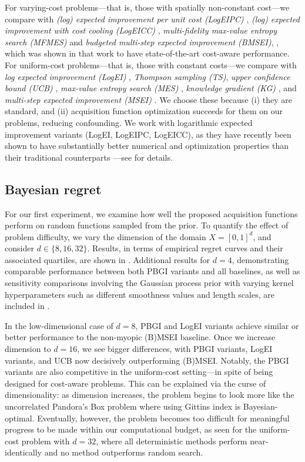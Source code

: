 \documentclass{article}
\begin{document}
For varying-cost problems---that is, those with spatially non-constant cost---we compare with \emph{(log) expected improvement per unit cost (LogEIPC)} \cite{snelson2003warped,snoek2012practical}, \emph{(log) expected improvement with cost cooling (LogEICC)} \cite{lee2020cost}, \emph{multi-fidelity max-value entropy search (MFMES)} \cite{takeno2020multi} and \emph{budgeted multi-step expected improvement (BMSEI)}, \cite{astudillo2021multi}, which was shown in that work to have state-of-the-art cost-aware performance.
For uniform-cost problems---that is, those with constant costs---we compare with \emph{log expected improvement (LogEI)} \cite{ament2023unexpected}, \emph{Thompson sampling (TS)}, \emph{upper confidence bound (UCB)} \cite{srinivas2009gaussian}, \emph{max-value entropy search (MES)} \cite{wang2017max}, \emph{knowledge gradient (KG)} \cite{frazier2009knowledge}, and \emph{multi-step expected improvement (MSEI)} \cite{jiang2020efficient}.
We choose these because (i) they are standard, and (ii) acquisition function optimization succeeds for them on our problems, reducing confounding.
We work with logarithmic expected improvement variants (LogEI, LogEIPC, LogEICC), as they have recently been shown to have substantially better numerical and optimization properties than their traditional counterparts \cite{ament2023unexpected}---see  for details.


\subsection{Bayesian regret}

For our first experiment, we examine how well the proposed acquisition functions perform on random functions sampled from the prior.
To quantify the effect of problem difficulty, we vary the dimension of the domain $X = [0,1]^d$, and consider $d \in \{8,16,32\}$.
Results, in terms of empirical regret curves and their associated quartiles, are shown in .
Additional results for $d=4$, demonstrating comparable performance between both PBGI variants and all baselines, as well as sensitivity comparisons involving the Gaussian process prior with varying kernel hyperparameters such as different smoothness values and length scales, are included in . 

In the low-dimensional case of $d=8$, PBGI and LogEI variants achieve similar or better performance to the non-myopic (B)MSEI baseline.
Once we increase dimension to $d=16$, we see bigger differences, with PBGI variants, LogEI variants, and UCB now decisively outperforming (B)MSEI.
Notably, the PBGI variants are also competitive in the uniform-cost setting---in spite of being designed for cost-aware problems.
This can be explained via the curse of dimensionality: as dimension increases, the problem begins to look more like the uncorrelated Pandora's Box problem where using Gittins index is Bayesian-optimal.
Eventually, however, the problem becomes too difficult for meaningful progress to be made within our computational budget, as seen for the uniform-cost problem with $d=32$, where all deterministic methods perform near-identically and no method outperforms random search.
\end{document}

